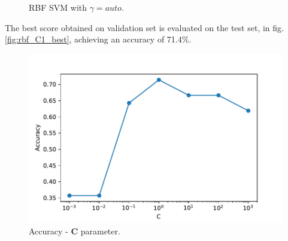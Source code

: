 \documentclass[10pt,a4paper]{article}
\begin{document}
\begin{figure}[!h]
	\qquad\qquad
	\caption{RBF SVM with $\gamma=auto$.\label{rbf_svm_c}}
\end{figure}
	 
	
The best score obtained on validation set is evaluated on the test set, in fig.\ref{fig:rbf_C1_best}, achieving an accuracy of 71.4\%.

\begin{figure}[t]
\centering
\includegraphics[width=0.7\linewidth]{../Images/c_accuracy_rbf_c.pdf}
\caption{Accuracy - \textbf{C} parameter.}
\label{fig:c_accuracy_rbf_c}
\end{figure}
\end{document}

